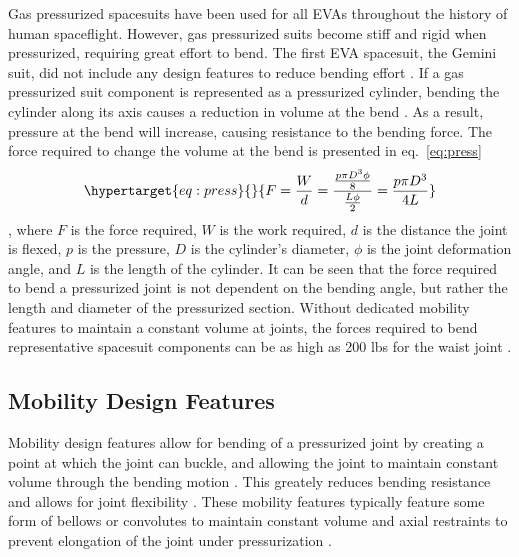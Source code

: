 \documentclass[defaultstyle,11pt]{comps}
\begin{document}
Gas pressurized spacesuits have been used for all EVAs throughout the history of human spaceflight.
However, gas pressurized suits become stiff and rigid when pressurized, requiring great effort to bend.
The first EVA spacesuit, the Gemini suit, did not include any design features to reduce bending effort \citep{Thomas2012}.
If a gas pressurized suit component is represented as a pressurized cylinder, bending the cylinder along its axis causes a reduction in volume at the bend \citep{Harris2001}.
As a result, pressure at the bend will increase, causing resistance to the bending force.
The force required to change the volume at the bend is presented in eq.~\ref{eq:press}
\begin{equation}\protect\hypertarget{eq:press}{}{
F = \frac{W}{d} = \frac{\frac{p\pi D^{3}\phi}{8}}{\frac{L\phi}{2}} = \frac{p\pi D^{3}}{4L}
}\label{eq:press}\end{equation}
\citep{Newman1997, Harris2001}, where \(F\) is the force required, \(W\) is the work required, \(d\) is the distance the joint is flexed, \(p\) is the pressure, \(D\) is the cylinder's diameter, \(\phi\) is the joint deformation angle, and \(L\) is the length of the cylinder.
It can be seen that the force required to bend a pressurized joint is not dependent on the bending angle, but rather the length and diameter of the pressurized section.
Without dedicated mobility features to maintain a constant volume at joints, the forces required to bend representative spacesuit components can be as high as 200 lbs for the waist joint \citep{Newman1997}.

\hypertarget{mobility-design-features}{%
\subsection{Mobility Design Features}\label{mobility-design-features}}

Mobility design features allow for bending of a pressurized joint by creating a point at which the joint can buckle, and allowing the joint to maintain constant volume through the bending motion \citep{Harris2001}.
This greately reduces bending resistance and allows for joint flexibility \citep{Harris2001}.
These mobility features typically feature some form of bellows or convolutes to maintain constant volume and axial restraints to prevent elongation of the joint under pressurization \citep{Harris2001}.
\end{document}
